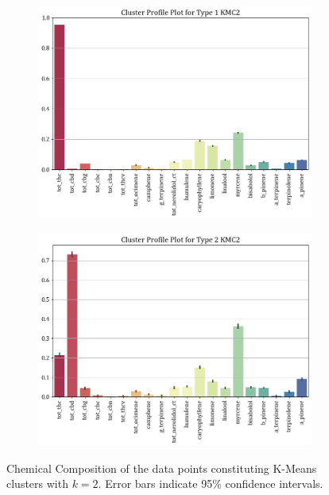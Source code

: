 \documentclass[11pt,a4paper]{article}
\begin{document}
\begin{figure}[H]
     \centering
     \begin{subfigure}[b]{0.475\textwidth}
         \centering
         \includegraphics[width=\textwidth]{images/km2_1.png}
         \label{fig:km2_1}
     \end{subfigure}
     \hfill
     \begin{subfigure}[b]{0.475\textwidth}
         \centering
         \includegraphics[width=\textwidth]{images/km2_2.png}
         \label{fig:km2_2}
     \end{subfigure}
    \caption{Chemical Composition of the data points constituting K-Means clusters with $k=2$. Error bars indicate 95\% confidence intervals.}
    \label{fig:km2}
\end{figure}
\end{document}

